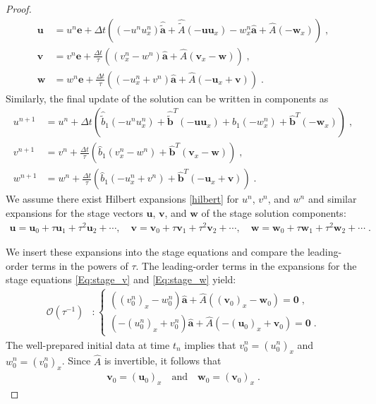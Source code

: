 \documentclass{article}
\newcommand{\tIIAex}{\hat{\tilde{A}}}
\newcommand{\tIIaex}{\pmb{\hat{\tilde{a}}}}
\newcommand{\tIIbexf}{\hat{\tilde{b}}_1}
\newcommand{\tIIbex}{\pmb{\hat{\tilde{b}}}}
\newcommand{\tIIAim}{\hat{A}}
\newcommand{\tIIaim}{\pmb{\hat{a}}}
\newcommand{\tIIbim}{\pmb{\hat{b}}}
\newcommand{\tIIbimf}{\hat{b}_1}
\begin{document}
\begin{proof}
\begin{subequations}
\begin{align}
    \pmb{u} &= u^n \pmb{e} + \Delta t \left( (-u^n u_{x}^n)\tIIaex + \tIIAex (-\pmb{u} \pmb{u}_x)  -w_x^n \tIIaim + \tIIAim(-\pmb{w}_x) \right) \;, \label{Eq:stage_u} \\
    \pmb{v} &= v^n \pmb{e} + \frac{\Delta t}{\tau} \left( (v_x^n - w^n) \tIIaim + \tIIAim(\pmb{v}_x-\pmb{w})\right) \;, \label{Eq:stage_v} \\
    \pmb{w} &= w^n \pmb{e} + \frac{\Delta t}{\tau} \left( (-u_x^n + v^n) \tIIaim + \tIIAim(-\pmb{u}_x+\pmb{v})\right) \;. \label{Eq:stage_w}
\end{align}
\end{subequations}
Similarly, the final update of the solution can be written in components as
\begin{subequations}
\begin{align}
    u^{n+1} &= u^n  + \Delta t \left( \tIIbexf(-u^n u_{x}^n) +  \tIIbex^T  (-\pmb{u} \pmb{u}_x) + \tIIbimf(-w_x^n)  + \tIIbim^T  (-\pmb{w}_x)  \right) \;, \label{Eq:sol_u} \\
    v^{n+1} &= v^n  + \frac{\Delta t}{\tau} \left( \tIIbimf(v_x^n - w^n)  + \tIIbim^T  (\pmb{v}_x-\pmb{w}) \right) \;, \label{Eq:sol_v} \\
    w^{n+1} &= w^n + \frac{\Delta t}{\tau} \left( \tIIbimf(-u_x^n + v^n)  + \tIIbim^T  (-\pmb{u}_x+\pmb{v}) \right)  \;. \label{Eq:sol_w}
\end{align}
\end{subequations}
We assume there exist Hilbert expansions \eqref{hilbert} for $u^n$, $v^n$, and $w^n$
and similar expansions for the stage vectors $\pmb{u}$, $\pmb{v}$, and $\pmb{w}$ of the stage solution components:
\begin{align*}
\pmb{u} = \pmb{u}_0 + \tau \pmb{u}_1 + \tau^2 \pmb{u}_2 + \cdots, \quad \pmb{v}  = \pmb{v}_0 + \tau \pmb{v}_1 + \tau^2 \pmb{v}_2 + \cdots, \quad \pmb{w} = \pmb{w}_0 + \tau \pmb{w}_1 + \tau^2 \pmb{w}_2 + \cdots \;.
\end{align*}

We insert these expansions into the stage equations and compare the leading-order terms in the powers of $\tau$.
The leading-order terms in the expansions for the stage equations \eqref{Eq:stage_v} and \eqref{Eq:stage_w} yield:
\begin{align*}
    \mathcal{O}\left(\tau^{-1}\right) &\colon
    \begin{cases}
        \left((v_0^n)_x - w_0^n \right) \tIIaim + \tIIAim  \left((\pmb{v}_0)_x - \pmb{w}_0\right) = \pmb{0} \;, \\
        \left(-(u_0^n)_x + v_0^n \right) \tIIaim + \tIIAim  \left(-(\pmb{u}_0)_x + \pmb{v}_0\right) = \pmb{0} \;.
    \end{cases}
\end{align*}
The well-prepared initial data at time $t_n$ implies that $v_0^n = (u_0^n)_x$ and $w_0^n = (v_0^n)_x$.
Since $\tIIAim$ is invertible, it follows that
\begin{align}\label{Eq:Aux_var_rel}
   \pmb{v}_0 = (\pmb{u}_0)_x \quad \text{and} \quad \pmb{w}_0 = (\pmb{v}_0)_x \;.
\end{align}


\end{proof}
\end{document}
